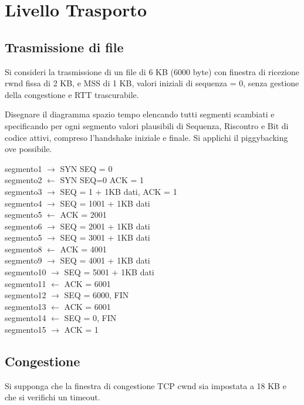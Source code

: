 \section{Livello Trasporto}
    \subsection{Trasmissione di file}
        \problem
        Si consideri la trasmissione di un file di 6 KB (6000 byte) con finestra di ricezione rwnd fissa di 2 KB, e MSS di 1 KB, valori iniziali di sequenza = 0, senza gestione della congestione e RTT trascurabile.

        Disegnare il diagramma spazio tempo elencando tutti segmenti scambiati e specificando per ogni segmento valori plausibili di Sequenza, Riscontro e Bit di codice attivi, compreso l'handshake iniziale e finale. Si applichi il piggybacking ove possibile.

        \solution
        segmento1 $\rightarrow$ SYN SEQ = 0\\
        segmento2 $\leftarrow$ SYN SEQ=0 ACK = 1\\
        segmento3 $\rightarrow$ SEQ = 1 + 1KB dati, ACK = 1\\
        segmento4 $\rightarrow$ SEQ = 1001 + 1KB dati\\
        segmento5 $\leftarrow$ ACK = 2001\\
        segmento6 $\rightarrow$ SEQ = 2001 + 1KB dati\\
        segmento5 $\rightarrow$ SEQ = 3001 + 1KB dati\\
        segmento8 $\leftarrow$ ACK = 4001\\
        segmento9 $\rightarrow$ SEQ = 4001 + 1KB dati\\
        segmento10 $\rightarrow$ SEQ = 5001 + 1KB dati\\
        segmento11 $\leftarrow$ ACK = 6001\\
        segmento12 $\rightarrow$ SEQ = 6000, FIN\\
        segmento13 $\leftarrow$ ACK = 6001\\
        segmento14 $\leftarrow$ SEQ = 0, FIN\\
        segmento15 $\rightarrow$ ACK = 1

    \subsection{Congestione}
        \problem
        Si supponga che la finestra di congestione TCP cwnd sia impostata a 18 KB e che si verifichi un timeout.
        
